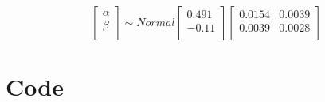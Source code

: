 \documentclass{article}
\begin{document}
\begin{center}
\[
\begin{bmatrix}
\alpha          \\
\beta             \\
            \end{bmatrix}
\sim Normal
\begin{bmatrix}
0.491     \\
-0.11    \\
\end{bmatrix}
\begin{bmatrix}
0.0154 &  0.0039    \\
0.0039   & 0.0028 \\
\end{bmatrix}
           \]
\end{center}

\section{Code}
\end{document}
